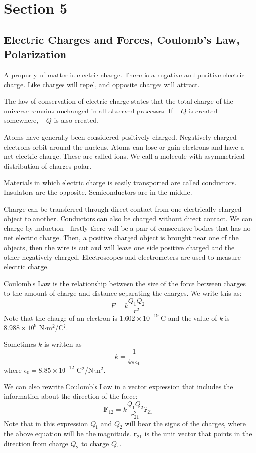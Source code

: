 \documentclass[../introphysics.tex]{subfiles}
\begin{document}
\chapter{Section 5}
\section{Electric Charges and Forces, Coulomb's Law, Polarization}
A property of matter is electric charge. There is a negative and positive electric charge. Like charges will repel, and opposite charges will attract.

The law of conservation of electric charge states that the total charge of the universe remains unchanged in all observed processes. If $+Q$ is created somewhere, $-Q$ is also created.

Atoms have generally been considered positively charged. Negatively charged electrons orbit around the nucleus. Atoms can lose or gain electrons and have a net electric charge. These are called ions. We call a molecule with asymmetrical distribution of charges polar.

Materials in which electric charge is easily transported are called conductors. Insulators are the opposite. Semiconductors are in the middle.

Charge can be transferred through direct contact from one electrically charged object to another. Conductors can also be charged without direct contact. We can charge by induction - firstly there will be a pair of consecutive bodies that has no net electric charge. Then, a positive charged object is brought near one of the objects, then the wire is cut and will leave one side positive charged and the other negatively charged. Electroscopes and electrometers are used to measure electric charge.

Coulomb's Law is the relationship between the size of the force between charges to the amount of charge and distance separating the charges. We write this as:
\[F=k\frac{Q_1Q_2}{r^2}\]
Note that the charge of an electron is $1.602\times10^{-19}$ C and the value of $k$ is $8.988\times10^9$ N$\cdot$m$^2$/C$^2$. 

Sometimes $k$ is written as
\[k=\frac{1}{4\pi\epsilon_0}\]
where $\epsilon_0 = 8.85\times10^{-12}$ C$^2$/N$\cdot$m$^2$.

We can also rewrite Coulomb's Law in a vector expression that includes the information about the direction of the force:
\[\textbf{F}_{12}=k\frac{Q_1Q_2}{r_{21}^2}\hat{\textbf{r}}_{21}\]
Note that in this expression $Q_1$ and $Q_2$ will bear the signs of the charges, where the above equation will be the magnitude. $\hat{\textbf{r}}_{21}$ is the unit vector that points in the direction from charge $Q_2$ to charge $Q_1$. 
\end{document}
